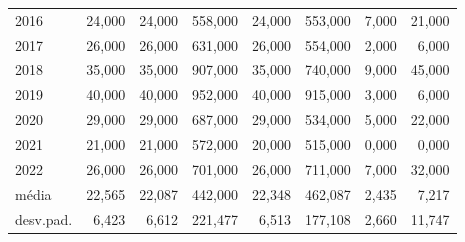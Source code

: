 \begin{table}
\begin{tabular}{lrrrrrrr}
2016 & 24,000 & 24,000 & 558,000 & 24,000 & 553,000 & 7,000 & 21,000 \\
2017 & 26,000 & 26,000 & 631,000 & 26,000 & 554,000 & 2,000 & 6,000 \\
2018 & 35,000 & 35,000 & 907,000 & 35,000 & 740,000 & 9,000 & 45,000 \\
2019 & 40,000 & 40,000 & 952,000 & 40,000 & 915,000 & 3,000 & 6,000 \\
2020 & 29,000 & 29,000 & 687,000 & 29,000 & 534,000 & 5,000 & 22,000 \\
2021 & 21,000 & 21,000 & 572,000 & 20,000 & 515,000 & 0,000 & 0,000 \\
2022 & 26,000 & 26,000 & 701,000 & 26,000 & 711,000 & 7,000 & 32,000 \\
média & 22,565 & 22,087 & 442,000 & 22,348 & 462,087 & 2,435 & 7,217 \\
desv.pad. & 6,423 & 6,612 & 221,477 & 6,513 & 177,108 & 2,660 & 11,747 \\
\end{tabular}
\end{table}
